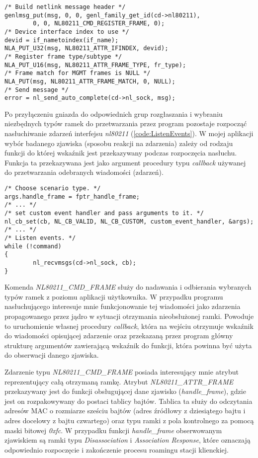 \begin{lstlisting}[frame=tb]
/* Build netlink message header */
genlmsg_put(msg, 0, 0, genl_family_get_id(cd->nl80211), 
        0, 0, NL80211_CMD_REGISTER_FRAME, 0);
/* Device interface index to use */
devid = if_nametoindex(if_name);
NLA_PUT_U32(msg, NL80211_ATTR_IFINDEX, devid);
/* Register frame type/subtype */
NLA_PUT_U16(msg, NL80211_ATTR_FRAME_TYPE, fr_type);
/* Frame match for MGMT frames is NULL */
NLA_PUT(msg, NL80211_ATTR_FRAME_MATCH, 0, NULL);       
/* Send message */
error = nl_send_auto_complete(cd->nl_sock, msg);
\end{lstlisting}

Po przyłączeniu gniazda do odpowiednich grup rozgłaszania i wybraniu niezbędnych typów ramek do przetwarzania przez program pozostaje rozpocząć nasłuchiwanie zdarzeń interfejsu \emph{nl80211} (\ref{code:ListenEvents}). W mojej aplikacji wybór badanego zjawiska (sposobu reakcji na zdarzenia) zależy od rodzaju funkcji do której wskaźnik jest przekazywany podczas rozpoczęcia nasłuchu. Funkcja ta przekazywana jest jako argument procedury typu \emph{callback} używanej do przetwarzania odebranych wiadomości (zdarzeń). 

\begin{lstlisting}[frame=tb]
/* Choose scenario type. */
args.handle_frame = fptr_handle_frame;
/* ... */
/* set custom event handler and pass arguments to it. */
nl_cb_set(cb, NL_CB_VALID, NL_CB_CUSTOM, custom_event_handler, &args);
/* ... */
/* Listen events. */
while (!command)
{
        nl_recvmsgs(cd->nl_sock, cb);
}
\end{lstlisting}

Komenda \emph{NL80211\_CMD\_FRAME} służy do nadawania i odbierania wybranych typów ramek z poziomu aplikacji użytkownika. W przypadku programu nasłuchującego interesuje mnie funkcjonowanie tej wiadomości jako zdarzenia propagowanego przez jądro w sytuacji otrzymania nieobsłużonej ramki. Powoduje to uruchomienie własnej procedury \emph{callback}, która na wejściu otrzymuje wskaźnik do wiadomości opisującej zdarzenie oraz przekazaną przez program główny strukturę argumentów zawierającą wskaźnik do funkcji, która powinna być użyta do obserwacji danego zjawiska. 

Zdarzenie typu \emph{NL80211\_CMD\_FRAME} posiada interesujący mnie atrybut reprezentujący całą otrzymaną ramkę. Atrybut \emph{NL80211\_ATTR\_FRAME} przekazywany jest do funkcji obsługującej dane zjawisko (\emph{handle\_frame}), gdzie jest on rozpakowywany do postaci tablicy bajtów. Tablica ta służy do odczytania adresów MAC o rozmiarze sześciu bajtów (adres źródłowy z dziesiątego bajtu i adres docelowy z bajtu czwartego) oraz typu ramki z pola kontrolnego za pomocą maski bitowej \emph{0xfc}. W przypadku funkcji \emph{handle\_frame} obserwowanym zjawiskiem są ramki typu \emph{Disassociation} i \emph{Association Response}, które oznaczają odpowiednio rozpoczęcie i zakończenie procesu roamingu stacji klienckiej.

